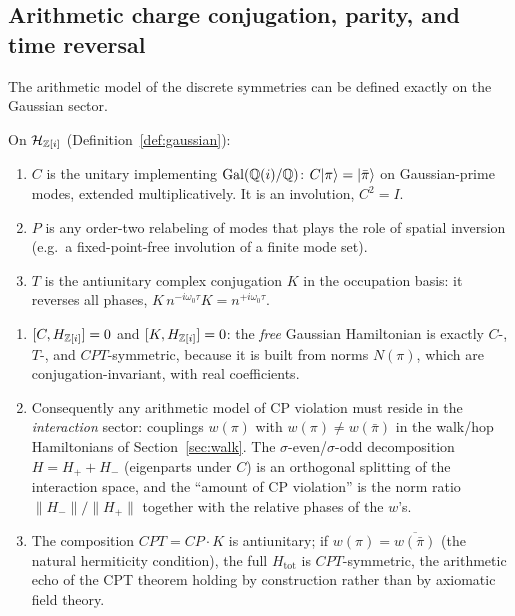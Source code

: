 \subsection{Arithmetic charge conjugation, parity, and time reversal}

The arithmetic model of the discrete symmetries can be defined exactly on the
Gaussian sector.

\begin{definition}[Arithmetic $C$, $P$, $T$]\label{def:cpt}
On $\mathcal{H}_{\mathbb{Z}[i]}$ (Definition~\ref{def:gaussian}):
\begin{enumerate}[leftmargin=1.6em]
\item $C$ is the unitary implementing $\operatorname{Gal}(\mathbb{Q}(i)/\mathbb{Q})$: $C\lvert \pi\rangle=\lvert \bar\pi\rangle$ on
Gaussian-prime modes, extended multiplicatively. It is an involution,
$C^{2}=I$.
\item $P$ is any order-two relabeling of modes that plays the role of spatial inversion
(e.g.\ a fixed-point-free involution of a finite mode set).
\item $T$ is the antiunitary complex conjugation $K$ in the occupation basis: it reverses
all phases, $K\,n^{-i\omega_{0}\tau}K=n^{+i\omega_{0}\tau}$.
\end{enumerate}
\end{definition}

\begin{proposition}\label{prop:cpt}
\begin{enumerate}[leftmargin=1.6em]
\item $[C,H_{\mathbb{Z}[i]}]=0$ and $[K,H_{\mathbb{Z}[i]}]=0$: the \emph{free} Gaussian Hamiltonian is
exactly $C$-, $T$-, and $CPT$-symmetric, because it is built from norms $N(\pi)$, which are
conjugation-invariant, with real coefficients.
\item Consequently any arithmetic model of CP violation must reside in the
\emph{interaction} sector: couplings $w(\pi)$ with
$w(\pi)\neq w(\bar\pi)$ in the walk/hop Hamiltonians of Section~\ref{sec:walk}. The
$\sigma$-even/$\sigma$-odd decomposition
$H=H_{+}+H_{-}$ (eigenparts under $C$) is an orthogonal splitting of the interaction space,
and the ``amount of CP violation'' is the norm ratio $\|H_{-}\|/\|H_{+}\|$ together with the
relative phases of the $w$'s.
\item The composition $CPT=CP\cdot K$ is antiunitary; if $w(\pi)=\overline{w(\bar\pi)}$
(the natural hermiticity condition), the full $H_{\mathrm{tot}}$ is $CPT$-symmetric,
the arithmetic echo of the CPT theorem holding by construction rather than by axiomatic
field theory.
\end{enumerate}
\end{proposition}

